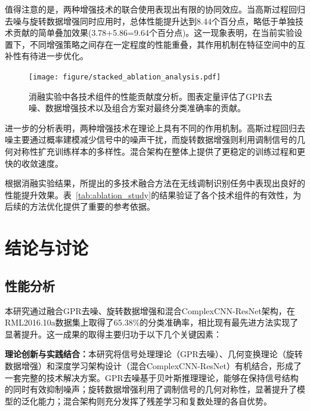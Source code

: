 \documentclass[conference]{IEEEtran}
\begin{document}
值得注意的是，两种增强技术的联合使用表现出有限的协同效应。当高斯过程回归去噪与旋转数据增强同时应用时，总体性能提升达到8.44个百分点，略低于单独技术贡献的简单叠加效果(3.78+5.86=9.64个百分点)。这一现象表明，在当前实验设置下，不同增强策略之间存在一定程度的性能重叠，其作用机制在特征空间中的互补性有待进一步优化。

\begin{figure}[htbp]
\centering
\texttt{[image: figure/stacked\_ablation\_analysis.pdf]}
\caption{消融实验中各技术组件的性能贡献度分析。图表定量评估了GPR去噪、数据增强技术以及组合方案对最终分类准确率的贡献。}
\label{fig:ablation_components}
\end{figure}

进一步的分析表明，两种增强技术在理论上具有不同的作用机制。高斯过程回归去噪主要通过概率建模减少信号中的噪声干扰，而旋转数据增强则利用调制信号的几何对称性扩充训练样本的多样性。混合架构在整体上提供了更稳定的训练过程和更快的收敛速度。



根据消融实验结果，所提出的多技术融合方法在无线调制识别任务中表现出良好的性能提升效果。表~\ref{tab:ablation_study}的结果验证了各个技术组件的有效性，为后续的方法优化提供了重要的参考依据。

\section{结论与讨论}

\subsection{性能分析}

本研究通过融合GPR去噪、旋转数据增强和混合ComplexCNN-ResNet架构，在RML2016.10a数据集上取得了65.38\%的分类准确率，相比现有最先进方法实现了显著提升。这一成果的取得主要归功于以下几个关键因素：

\textbf{理论创新与实践结合：}本研究将信号处理理论（GPR去噪）、几何变换理论（旋转数据增强）和深度学习架构设计（混合ComplexCNN-ResNet）有机结合，形成了一套完整的技术解决方案。GPR去噪基于贝叶斯推理理论，能够在保持信号结构的同时有效抑制噪声；旋转数据增强利用了调制信号的几何对称性，显著提升了模型的泛化能力；混合架构则充分发挥了残差学习和复数处理的各自优势。

\end{document}
